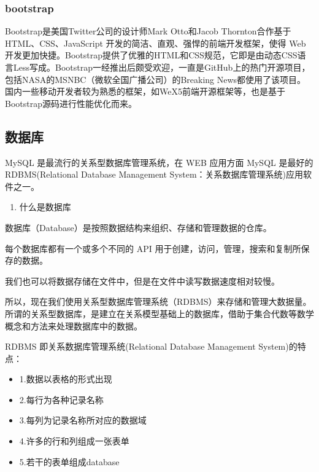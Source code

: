 \documentclass[
]{article}
\begin{document}
\hypertarget{bootstrap}{%
\subsubsection{bootstrap}\label{bootstrap}}

Bootstrap是美国Twitter公司的设计师Mark Otto和Jacob
Thornton合作基于HTML、CSS、JavaScript
开发的简洁、直观、强悍的前端开发框架，使得 Web
开发更加快捷。Bootstrap提供了优雅的HTML和CSS规范，它即是由动态CSS语言Less写成。Bootstrap一经推出后颇受欢迎，一直是GitHub上的热门开源项目，包括NASA的MSNBC（微软全国广播公司）的Breaking
News都使用了该项目。
国内一些移动开发者较为熟悉的框架，如WeX5前端开源框架等，也是基于Bootstrap源码进行性能优化而来。

\hypertarget{ux6570ux636eux5e93}{%
\subsection{数据库}\label{ux6570ux636eux5e93}}

MySQL 是最流行的关系型数据库管理系统，在 WEB 应用方面 MySQL 是最好的
RDBMS(Relational Database Management
System：关系数据库管理系统)应用软件之一。

\begin{enumerate}
\def\labelenumi{\arabic{enumi}.}
\item
  什么是数据库
\end{enumerate}

数据库（Database）是按照数据结构来组织、存储和管理数据的仓库。

每个数据库都有一个或多个不同的 API
用于创建，访问，管理，搜索和复制所保存的数据。

我们也可以将数据存储在文件中，但是在文件中读写数据速度相对较慢。

所以，现在我们使用关系型数据库管理系统（RDBMS）来存储和管理大数据量。所谓的关系型数据库，是建立在关系模型基础上的数据库，借助于集合代数等数学概念和方法来处理数据库中的数据。

RDBMS 即关系数据库管理系统(Relational Database Management
System)的特点：

\begin{itemize}
\item
  1.数据以表格的形式出现
\item
  2.每行为各种记录名称
\item
  3.每列为记录名称所对应的数据域
\item
  4.许多的行和列组成一张表单
\item
  5.若干的表单组成database
\end{itemize}
\end{document}
